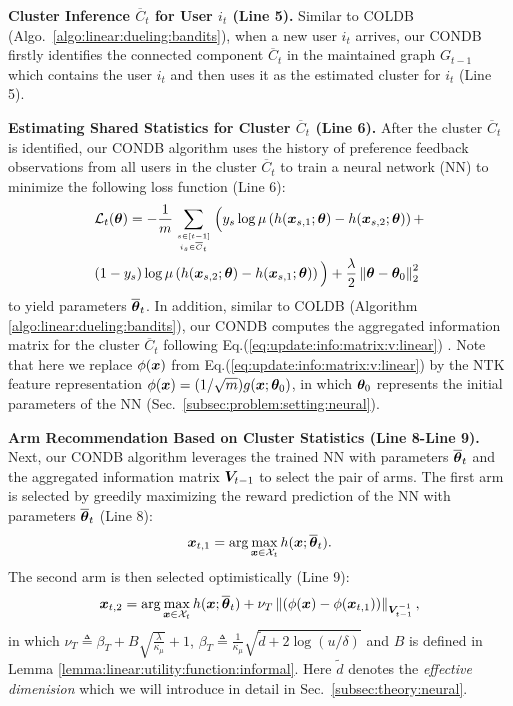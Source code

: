 \noindent\textbf{Cluster Inference $\overline{C}_t$ for User $i_t$ (Line 5).} 
Similar to COLDB (Algo.~\ref{algo:linear:dueling:bandits}), when a new user $i_t$ arrives,  our CONDB firstly identifies the connected component $\overline{C}_t$ in the maintained graph $G_{t-1}$ which contains the user $i_t$ and then uses it as the estimated cluster for $i_t$ (Line 5).

\noindent\textbf{Estimating Shared Statistics for Cluster $\overline{C}_t$ (Line 6).}
After the cluster $\overline{C}_t$ is identified, our CONDB algorithm uses the history of preference feedback observations from all users in the cluster $\overline{C}_t$
to train a neural network (NN) to minimize the following loss function (Line 6):
\begin{align}
    &\mathcal{L}_t(\boldsymbol{\theta})=
    - \frac{1}{m} \sum_{s\in[t-1]\atop i_s\in \overline C_t}\Big( y_s\log\mu\left( h(\boldsymbol{x}_{s,1};\boldsymbol{\theta}) - h(\boldsymbol{x}_{s,2};\boldsymbol{\theta}) \right) + \notag \\
    &(1-y_s)\log\mu\left(h(\boldsymbol{x}_{s,2};\boldsymbol{\theta}) - h(\boldsymbol{x}_{s,1};\boldsymbol{\theta})\right) \Big) + \frac{\lambda}{2}\left\| \boldsymbol{\theta} - \boldsymbol{\theta}_0 \right\|_2^2
\end{align}
to yield parameters $\overline{\boldsymbol{\theta}}_t$.
In addition, similar to COLDB (Algorithm \ref{algo:linear:dueling:bandits}), our CONDB computes the aggregated information matrix for the cluster $\overline{C}_t$ following Eq.(\ref{eq:update:info:matrix:v:linear})
.
Note that here we replace $\phi(\boldsymbol{x})$ from Eq.(\ref{eq:update:info:matrix:v:linear}) by the NTK feature representation $\phi(\boldsymbol{x})=(1/\sqrt{m})g(\boldsymbol{x};\boldsymbol{\theta}_0)$, in which $\boldsymbol{\theta}_0$ represents the initial parameters of the NN (Sec.~\ref{subsec:problem:setting:neural}).

\noindent\textbf{Arm Recommendation Based on Cluster Statistics (Line 8-Line 9).} 
Next, our CONDB algorithm leverages the trained NN with parameters $\overline{\boldsymbol{\theta}}_t$ and the aggregated information matrix $\boldsymbol{V}_{t-1}$ to select the pair of arms.
The first arm is selected by greedily maximizing the reward prediction of the NN with parameters $\overline{\boldsymbol{\theta}}_t$ (Line 8): 
\begin{equation}
\boldsymbol{x}_{t,1} = \arg\max_{\boldsymbol{x}\in\mathcal{X}_t} h(\boldsymbol{x};\overline{\boldsymbol{\theta}}_t).
\end{equation}
The second arm is then selected optimistically (Line 9):
\begin{equation}
\boldsymbol{x}_{t,2} = \arg\max_{\boldsymbol{x}\in\mathcal{X}_t} h(\boldsymbol{x};\overline{\boldsymbol{\theta}}_t) + \nu_T \left\| \left(\phi(\boldsymbol{x}) - \phi(\boldsymbol{x}_{t,1})\right) \right\|_{\boldsymbol{V}_{t-1}^{-1}},
\end{equation}
in which $\nu_T \triangleq \beta_T + B\sqrt{\frac{\lambda}{\kappa_\mu}} + 1$, $\beta_T \triangleq \frac{1}{\kappa_\mu} \sqrt{ \widetilde{d} + 2\log(u/\delta)}$ and $B$ is defined in Lemma \ref{lemma:linear:utility:function:informal}.
Here $\widetilde{d}$ denotes the \emph{effective dimenision} which we will introduce in detail in Sec.~\ref{subsec:theory:neural}.


